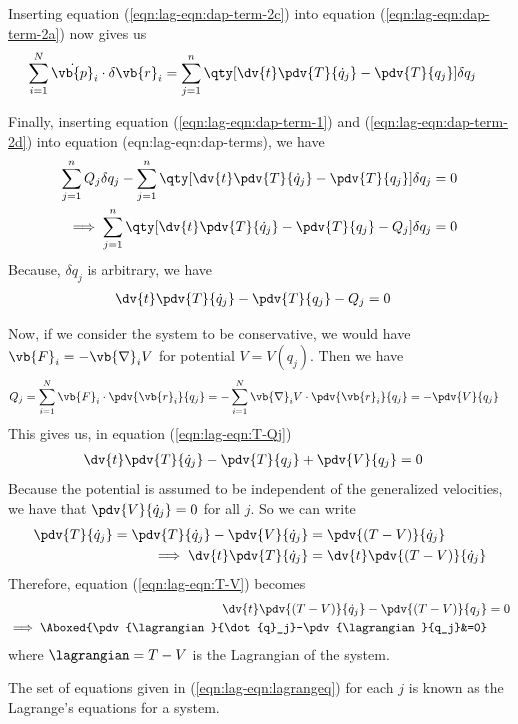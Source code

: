 Inserting equation (\ref{eqn:lag-eqn:dap-term-2c}) into equation (\ref{eqn:lag-eqn:dap-term-2a}) now gives us
\begin{align}
	\sum_{i=1}^{N}{\dot{\vb{p}}_i\cdot\delta{\vb{r}_i}}&=\sum_{j=1}^{n}{\qty[\dv{t}\pdv{T}{\dot{q}_j}-\pdv{T}{q_j}]\delta{q_j}} \label{eqn:lag-eqn:dap-term-2d}
\end{align}

Finally, inserting equation (\ref{eqn:lag-eqn:dap-term-1}) and (\ref{eqn:lag-eqn:dap-term-2d}) into equation (eqn:lag-eqn:dap-terms), we have
\begin{align*}
	\sum_{j=1}^{n}{Q_j\delta{q_j}}-\sum_{j=1}^{n}{\qty[\dv{t}\pdv{T}{\dot{q}_j}-\pdv{T}{q_j}]\delta{q_j}}&=0 \\
	\implies\sum_{j=1}^{n}{\qty[\dv{t}\pdv{T}{\dot{q}_j}-\pdv{T}{q_j}-Q_j]\delta{q_j}}&=0
\end{align*}
Because, $\delta{q}_j$ is arbitrary, we have
\begin{align}
	\dv{t}\pdv{T}{\dot{q}_j}-\pdv{T}{q_j}-Q_j&=0 \label{eqn:lag-eqn:T-Qj}
\end{align}

Now, if we consider the system to be conservative, we would have $\vb{F}_i=-\vb{\nabla}_iV$ for potential $V=V(q_j)$. Then we have
\begin{align*}
	Q_j&=\sum_{i=1}^{N}{\vb{F}_i\cdot\pdv{\vb{r}_i}{q_j}}=-\sum_{i=1}^{N}{\vb{\nabla}_iV\cdot\pdv{\vb{r}_i}{q_j}}=-\pdv{V}{q_j}
\end{align*}
This gives us, in equation (\ref{eqn:lag-eqn:T-Qj})
\begin{align}
	\dv{t}\pdv{T}{\dot{q}_j}-\pdv{T}{q_j}+\pdv{V}{q_j}&=0 \label{eqn:lag-eqn:T-V}
\end{align}
Because the potential is assumed to be independent of the generalized velocities, we have that $\pdv{V}{\dot{q}_j}=0$ for all $j$. So we can write
\begin{align*}
	\pdv{T}{\dot{q}_j}=\pdv{T}{\dot{q}_j}-\pdv{V}{\dot{q}_j}&=\pdv{(T-V)}{\dot{q}_j} \\
	\implies\dv{t}\pdv{T}{\dot{q}_j}&=\dv{t}\pdv{(T-V)}{\dot{q}_j}
\end{align*}
Therefore, equation (\ref{eqn:lag-eqn:T-V}) becomes
\begin{align}
	\dv{t}\pdv{(T-V)}{\dot{q}_j}-\pdv{(T-V)}{q_j}&=0 \nonumber\\
	\implies\Aboxed{\pdv{\lagrangian}{\dot{q}_j}-\pdv{\lagrangian}{q_j}&=0} \label{eqn:lag-eqn:lagrangeq}
\end{align}
where $\lagrangian=T-V$ is the Lagrangian of the system.

The set of equations given in (\ref{eqn:lag-eqn:lagrangeq}) for each $j$ is known as the Lagrange's equations for a system.
